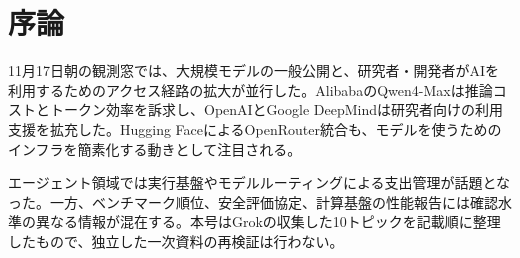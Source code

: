 \section{序論}
11月17日朝の観測窓では、大規模モデルの一般公開と、研究者・開発者がAIを利用するためのアクセス経路の拡大が並行した。AlibabaのQwen4-Maxは推論コストとトークン効率を訴求し、OpenAIとGoogle DeepMindは研究者向けの利用支援を拡充した。Hugging FaceによるOpenRouter統合も、モデルを使うためのインフラを簡素化する動きとして注目される。

エージェント領域では実行基盤やモデルルーティングによる支出管理が話題となった。一方、ベンチマーク順位、安全評価協定、計算基盤の性能報告には確認水準の異なる情報が混在する。本号はGrokの収集した10トピックを記載順に整理したもので、独立した一次資料の再検証は行わない。